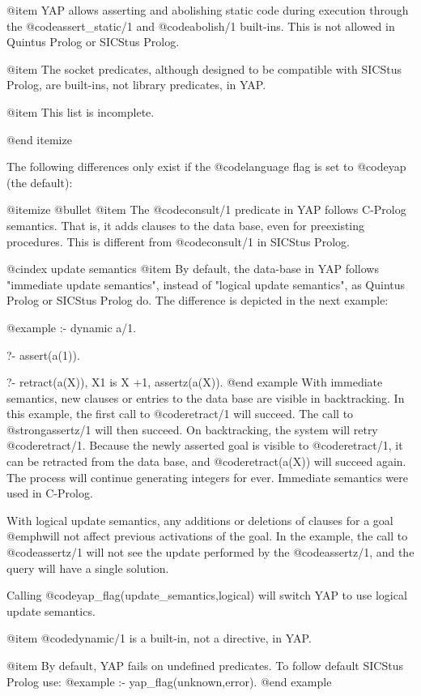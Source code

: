 {{{{{{{{{@item YAP allows asserting and abolishing static code during
execution through the @code{assert_static/1} and @code{abolish/1}
built-ins. This is not allowed in Quintus Prolog or SICStus Prolog.

@item The socket predicates, although designed to be compatible with
SICStus Prolog, are built-ins, not library predicates, in YAP.

@item This list is incomplete.

@end itemize

The following differences only exist if the @code{language} flag is set
to @code{yap} (the default):

@itemize @bullet
@item The @code{consult/1} predicate in YAP follows C-Prolog
semantics. That is, it adds clauses to the data base, even for
preexisting procedures. This is different from @code{consult/1} in
SICStus Prolog.

@cindex update semantics
@item By default, the data-base in YAP follows "immediate update
semantics", instead of "logical update semantics", as Quintus Prolog or
SICStus Prolog do. The difference is depicted in the next example:

@example
:- dynamic a/1.

?- assert(a(1)).

?- retract(a(X)), X1 is X +1, assertz(a(X)).
@end example
With immediate semantics, new clauses or entries to the data base are
visible in backtracking. In this example, the first call to
@code{retract/1} will succeed. The call to @strong{assertz/1} will then
succeed. On backtracking, the system will retry
@code{retract/1}. Because the newly asserted goal is visible to
@code{retract/1}, it can be retracted from the data base, and
@code{retract(a(X))} will succeed again. The process will continue
generating integers for ever. Immediate semantics were used in C-Prolog.

With logical update semantics, any additions or deletions of clauses
for a goal @emph{will not affect previous activations of the
goal}. In the example, the call to @code{assertz/1} will not see the
update performed by the @code{assertz/1}, and the query will have a
single solution.

Calling @code{yap_flag(update_semantics,logical)} will switch
YAP to use logical update semantics.

@item @code{dynamic/1} is a built-in, not a directive, in YAP.

@item By default, YAP fails on undefined predicates. To follow default
SICStus Prolog use:
@example
:- yap_flag(unknown,error).
@end example

}}}}}}}}}
